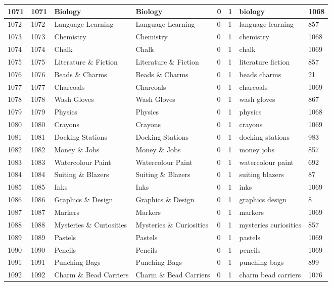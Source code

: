 \begin{longtable}{|l|l|l|l|l|l|l|l|}
1071 & 1071 & Biology & Biology & 0 & 1 & biology & 1068 \\ \hline 
1072 & 1072 & Language Learning & Language Learning & 0 & 1 & language learning & 857 \\ \hline 
1073 & 1073 & Chemistry & Chemistry & 0 & 1 & chemistry & 1068 \\ \hline 
1074 & 1074 & Chalk & Chalk & 0 & 1 & chalk & 1069 \\ \hline 
1075 & 1075 & Literature \& Fiction & Literature \& Fiction & 0 & 1 & literature fiction & 857 \\ \hline 
1076 & 1076 & Beads \& Charms & Beads \& Charms & 0 & 1 & beads charms & 21 \\ \hline 
1077 & 1077 & Charcoals & Charcoals & 0 & 1 & charcoals & 1069 \\ \hline 
1078 & 1078 & Wash Gloves & Wash Gloves & 0 & 1 & wash gloves & 867 \\ \hline 
1079 & 1079 & Physics & Physics & 0 & 1 & physics & 1068 \\ \hline 
1080 & 1080 & Crayons & Crayons & 0 & 1 & crayons & 1069 \\ \hline 
1081 & 1081 & Docking Stations & Docking Stations & 0 & 1 & docking stations & 983 \\ \hline 
1082 & 1082 & Money \& Jobs & Money \& Jobs & 0 & 1 & money jobs & 857 \\ \hline 
1083 & 1083 & Watercolour Paint & Watercolour Paint & 0 & 1 & watercolour paint & 692 \\ \hline 
1084 & 1084 & Suiting \& Blazers & Suiting \& Blazers & 0 & 1 & suiting blazers & 87 \\ \hline 
1085 & 1085 & Inks & Inks & 0 & 1 & inks & 1069 \\ \hline 
1086 & 1086 & Graphics \& Design & Graphics \& Design & 0 & 1 & graphics design & 8 \\ \hline 
1087 & 1087 & Markers & Markers & 0 & 1 & markers & 1069 \\ \hline 
1088 & 1088 & Mysteries \& Curiosities & Mysteries \& Curiosities & 0 & 1 & mysteries curiosities & 857 \\ \hline 
1089 & 1089 & Pastels & Pastels & 0 & 1 & pastels & 1069 \\ \hline 
1090 & 1090 & Pencils & Pencils & 0 & 1 & pencils & 1069 \\ \hline 
1091 & 1091 & Punching Bags & Punching Bags & 0 & 1 & punching bags & 899 \\ \hline 
1092 & 1092 & Charm \& Bead Carriers & Charm \& Bead Carriers & 0 & 1 & charm bead carriers & 1076 \\ \hline 

\end{longtable}
